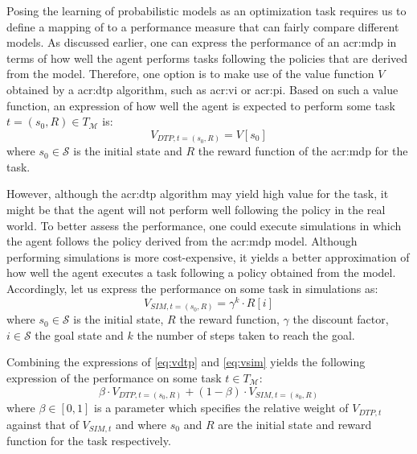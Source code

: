 Posing the learning of probabilistic models as an optimization task requires us to define a mapping of  to a performance measure that can fairly compare different models.
As discussed earlier, one can express the performance of an \acrshort{acr:mdp} in terms of how well the agent performs tasks following the policies that are derived from the model.
Therefore, one option is to make use of the value function $V$ obtained by a \acrshort{acr:dtp} algorithm, such as \acrshort{acr:vi} or \acrshort{acr:pi}.
Based on such a value function, an expression of how well the agent is expected to perform some task $t = (s_0, R) \in T_\mathcal{M}$ is:
\begin{equation}
\label{eq:vdtp}
V_{\mathit{DTP}, t=(s_0, R)} = V[s_0]
\end{equation}
where $s_0 \in \mathcal{S}$ is the initial state and $R$ the reward function of the \acrshort{acr:mdp} for the task.

However, although the \acrshort{acr:dtp} algorithm may yield high value for the task, it might be that the agent will not perform well following the policy in the real world.
To better assess the performance, one could execute simulations in which the agent follows the policy derived from the \acrshort{acr:mdp} model.
Although performing simulations is more cost-expensive, it yields a better approximation of how well the agent executes a task following a policy obtained from the model.
Accordingly, let us express the performance on some task in simulations as:
\begin{equation}
\label{eq:vsim}
V_{\mathit{SIM}, t=(s_0, R)} = \gamma^{k} \cdot R[i]
\end{equation}
where $s_0 \in \mathcal{S}$ is the initial state, $R$ the reward function, $\gamma$ the discount factor, $i \in \mathcal{S}$ the goal state and $k$ the number of steps taken to reach the goal.

Combining the expressions of \autoref{eq:vdtp} and \autoref{eq:vsim} yields the following expression of the performance on some task $t \in T_\mathcal{M}$:
\begin{equation}
\label{eq:vcom}
\beta \cdot V_{\mathit{DTP}, t=(s_0, R)} + (1 - \beta) \cdot V_{\mathit{SIM}, t=(s_0, R)}
\end{equation}
where $\beta \in [0, 1]$ is a parameter which specifies the relative weight of $V_{\mathit{DTP}, t}$ against that of $V_{\mathit{SIM}, t}$ and where $s_0$ and $R$ are the initial state and reward function for the task respectively.

